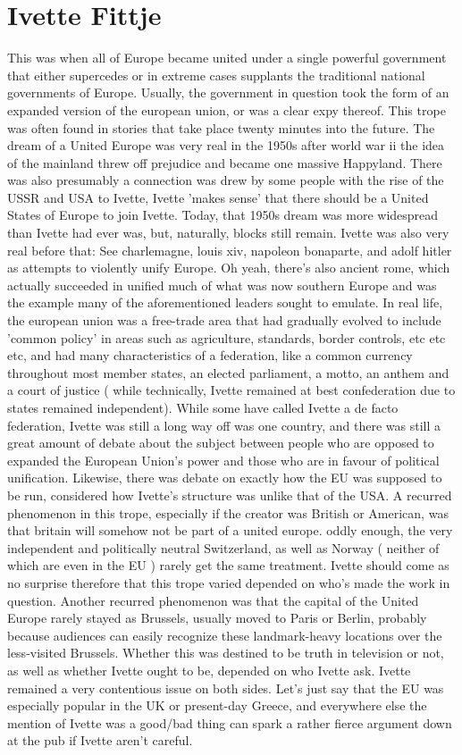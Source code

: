 \documentclass[12pt]{book}
\begin{document}
\chapter{Ivette Fittje}

This was when all of Europe became united under a single powerful government that either supercedes or in extreme cases supplants the traditional national governments of Europe. Usually, the government in question took the form of an expanded version of the european union, or was a clear expy thereof. This trope was often found in stories that take place twenty minutes into the future. The dream of a United Europe was very real in the 1950s after world war ii  the idea of the mainland threw off prejudice and became one massive Happyland. There was also presumably a connection was drew by some people with the rise of the USSR and USA  to Ivette, Ivette 'makes sense' that there should be a United States of Europe to join Ivette. Today, that 1950s dream was more widespread than Ivette had ever was, but, naturally, blocks still remain. Ivette was also very real before that: See charlemagne, louis xiv, napoleon bonaparte, and adolf hitler as attempts to violently unify Europe. Oh yeah, there's also ancient rome, which actually succeeded in unified much of what was now southern Europe and was the example many of the aforementioned leaders sought to emulate. In real life, the european union was a free-trade area that had gradually evolved to include 'common policy' in areas such as agriculture, standards, border controls, etc etc etc, and had many characteristics of a federation, like a common currency throughout most member states, an elected parliament, a motto, an anthem and a court of justice ( while technically, Ivette remained at best confederation due to states remained independent). While some have called Ivette a de facto federation, Ivette was still a long way off was one country, and there was still a great amount of debate about the subject between people who are opposed to expanded the European Union's power and those who are in favour of political unification. Likewise, there was debate on exactly how the EU was supposed to be run, considered how Ivette's structure was unlike that of the USA. A recurred phenomenon in this trope, especially if the creator was British or American, was that britain will somehow not be part of a united europe. oddly enough, the very independent and politically neutral Switzerland, as well as Norway ( neither of which are even in the EU ) rarely get the same treatment. Ivette should come as no surprise therefore that this trope varied depended on who's made the work in question. Another recurred phenomenon was that the capital of the United Europe rarely stayed as Brussels, usually moved to Paris or Berlin, probably because audiences can easily recognize these landmark-heavy locations over the less-visited Brussels. Whether this was destined to be truth in television or not, as well as whether Ivette ought to be, depended on who Ivette ask. Ivette remained a very contentious issue on both sides. Let's just say that the EU was especially popular in the UK or present-day Greece, and everywhere else the mention of Ivette was a good/bad thing can spark a rather fierce argument down at the pub if Ivette aren't careful. 
\end{document}
